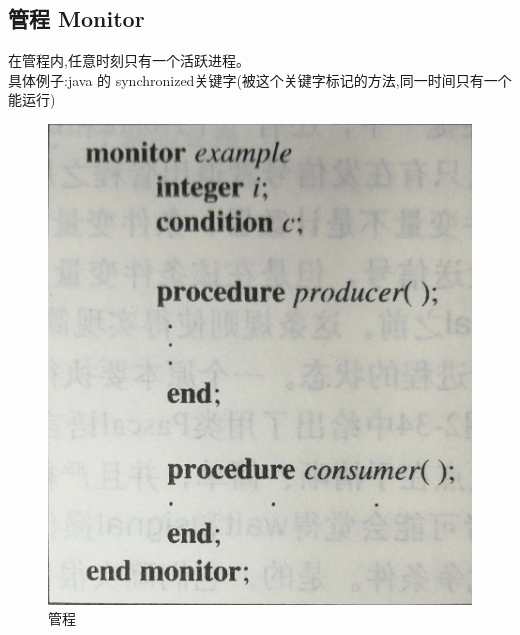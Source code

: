 \documentclass[UTF8,a4paper]{ctexart}
\begin{document}
\subsection{管程 Monitor}
在管程内,任意时刻只有一个活跃进程。\\
具体例子:java 的 synchronized关键字(被这个关键字标记的方法,同一时间只有一个能运行)
\begin{figure}[H]\centering
	\includegraphics[scale = 0.1]{assets/ModernOperatingSystems_f64a5.png}
	\caption{管程}
\end{figure}
\end{document}
